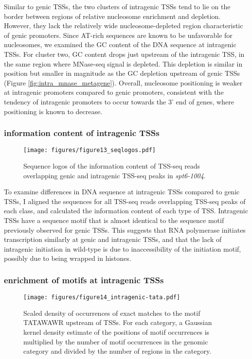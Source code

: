 \documentclass[9pt, letterpaper]{article}
\begin{document}
Similar to genic TSSs, the two clusters of intragenic TSSs tend to lie on the border between regions of relative nucleosome enrichment and depletion. However, they lack the relatively wide nucleosome-depleted region characteristic of genic promoters. Since AT-rich sequences are known to be unfavorable for nucleosomes, we examined the GC content of the DNA sequence at intragenic TSSs. For cluster two, GC content drops just upstream of the intragenic TSS, in the same region where MNase-seq signal is depleted. This depletion is similar in position but smaller in magnitude as the GC depletion upstream of genic TSSs (Figure \ref{fig:intra_mnase_metagene}). Overall, nucleosome positioning is weaker at intragenic promoters compared to genic promoters, consistent with the tendency of intragenic promoters to occur towards the 3' end of genes, where positioning is known to decrease.

\pagebreak

\subsubsection{information content of intragenic TSSs}

\begin{wrapfigure}[12]{R}{8.72cm}
\centering
\texttt{[image: figures/figure13\_seqlogos.pdf]}
\caption{Sequence logos of the information content of TSS-seq reads overlapping genic and intragenic TSS-seq peaks in \textit{spt6-1004}.}
\end{wrapfigure}

To examine differences in DNA sequence at intragenic TSSs compared to genic TSSs, I aligned the sequences for all TSS-seq reads overlapping TSS-seq peaks of each class, and calculated the information content of each type of TSS. Intragenic TSSs have a sequence motif that is almost identical to the sequence motif previously observed for genic TSSs. This suggests that RNA polymerase initiates transcription similarly at genic and intragenic TSSs, and that the lack of intragenic initiation in wild-type is due to inaccessibility of the initiation motif, possibly due to being wrapped in histones.

\subsubsection{enrichment of motifs at intragenic TSSs}

\begin{wrapfigure}[12]{r}{8.72cm}
\centering
\texttt{[image: figures/figure14\_intragenic-tata.pdf]}
\caption{Scaled density of occurrences of exact matches to the motif TATAWAWR upstream of TSSs. For each category, a Gaussian kernel density estimate of the positions of motif occurrences is multiplied by the number of motif occurrences in the genomic category and divided by the number of regions in the category.}
\end{wrapfigure}
\end{document}
